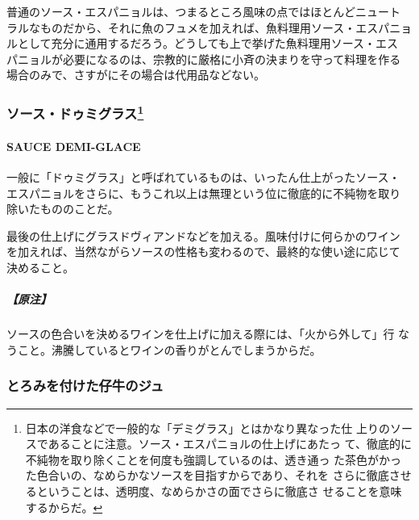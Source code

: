 \documentclass[twoside,12Q,b5j]{escoffierltjsbook}
\begin{document}
普通のソース・エスパニョルは、つまるところ風味の点ではほとんどニュート
ラルなものだから、それに魚のフュメを加えれば、魚料理用ソース・エスパニョ
ルとして充分に通用するだろう。どうしても上で挙げた魚料理用ソース・エス
パニョルが必要になるのは、宗教的に厳格に小斉の決まりを守って料理を作る
場合のみで、さすがにその場合は代用品などない。

\vspace*{1.7\zw}

\subsubsection[ソース・ドゥミグラス]{\texorpdfstring{ソース・ドゥミグラス\footnote{日本の洋食などで一般的な「デミグラス」とはかなり異なった仕
  上りのソースであることに注意。ソース・エスパニョルの仕上げにあたっ
  て、徹底的に不純物を取り除くことを何度も強調しているのは、透き通っ
  た茶色がかった色合いの、なめらかなソースを目指すからであり、それを
  さらに徹底させるということは、透明度、なめらかさの面でさらに徹底さ
  せることを意味するからだ。}}{ソース・ドゥミグラス}}\label{ux30bdux30fcux30b9ux30c9ux30a5ux30dfux30b0ux30e9ux30b9102009}

\paragraph{SAUCE DEMI-GLACE}\label{sauce-demi-glace}


一般に「ドゥミグラス」と呼ばれているものは、いったん仕上がったソース・
エスパニョルをさらに、もうこれ以上は無理という位に徹底的に不純物を取り
除いたもののことだ。

最後の仕上げにグラスドヴィアンドなどを加える。風味付けに何らかのワイン
を加えれば、当然ながらソースの性格も変わるので、最終的な使い途に応じて
決めること。

\subparagraph{【原注】}\label{ux539fux6ce8-1}

ソースの色合いを決めるワインを仕上げに加える際には、「火から外して」行
なうこと。沸騰しているとワインの香りがとんでしまうからだ。

\vspace*{1.7\zw}

\subsubsection{とろみを付けた仔牛のジュ}\label{ux3068ux308dux307fux3092ux4ed8ux3051ux305fux4ed4ux725bux306eux30b8ux30e5}
\end{document}
